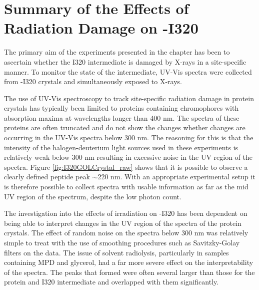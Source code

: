 \clearpage

\section{Summary of the Effects of Radiation Damage on \atpdx -I320}

The primary aim of the experiments presented in the chapter has been to ascertain whether the I320 intermediate is damaged by X-rays in a site-specific manner. To monitor the state of the intermediate, UV-Vis spectra were collected from \atpdx -I320 crystals and simultaneously exposed to X-rays. 

The use of UV-Vis spectroscopy to track site-specific radiation damage in protein crystals has typically been limited to proteins containing chromophores with absorption maxima at wavelengths longer than 400 nm. The spectra of these proteins are often truncated and do not show the changes whether changes are occurring in the UV-Vis spectra below 300 nm. The reasoning for this is that the intensity of the halogen-deuterium light sources used in these experiments is relatively weak below 300 nm resulting in excessive noise in the UV region of the spectra. Figure \ref{fig:I320GOLCrystal_raw} shows that it is possible to observe a clearly defined peptide peak $\sim$220 nm. With an appropriate experimental setup it is therefore possible to collect spectra with usable information as far as the mid UV region of the spectrum, despite the low photon count. 

The investigation into the effects of irradiation on \atpdx -I320 has been dependent on being able to interpret changes in the UV region of the spectra of the protein crystals. The effect of random noise on the spectra below 300 nm was relatively simple to treat with the use of smoothing procedures such as Savitzky-Golay filters on the data. The issue of solvent radiolysis, particularly in samples containing MPD and glycerol, had a far more severe effect on the interpretability of the spectra. The peaks that formed were often several larger than those for the protein and I320 intermediate and overlapped with them significantly. 


